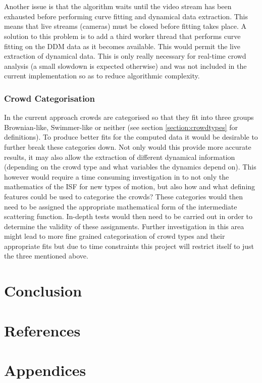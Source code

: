 \documentclass[11pt]{article}
\begin{document}
\\\\
Another issue is that the algorithm waits until the video stream has been exhausted before performing curve fitting and dynamical data extraction. This means that live streams (cameras) must be closed before fitting takes place. A solution to this problem is to add a third worker thread that performs curve fitting on the DDM data as it becomes available. This would permit the live extraction of dynamical data. This is only really necessary for real-time crowd analysis (a small slowdown is expected otherwise) and was not included in the current implementation so as to reduce algorithmic complexity.
\subsubsection{Crowd Categorisation}
In the current approach crowds are categorised so that they fit into three groups Brownian-like, Swimmer-like or neither (see section \ref{section:crowdtypes} for definitions). To produce better fits for the computed data it would be desirable to further break these categories down. Not only would this provide more accurate results, it may also allow the extraction of different dynamical information (depending on the crowd type and what variables the dynamics depend on). This however would require a time consuming investigation in to not only the mathematics of the ISF for new types of motion, but also how and what defining features could be used to categorise the crowds? These categories would then need to be assigned the appropriate mathematical form of the intermediate scattering function. In-depth tests would then need to be carried out in order to determine the validity of these assignments. Further investigation in this area might lead to more fine grained categorisation of crowd types and their appropriate fits but due to time constraints this project will restrict itself to just the three mentioned above.


\section{Conclusion}


\clearpage
\section{References}
\printbibliography[heading=none]

\clearpage
\section{Appendices}
\end{document}
